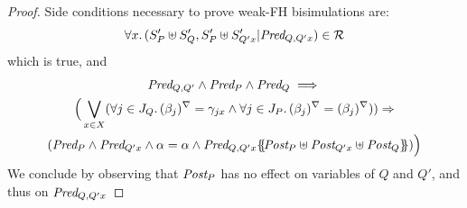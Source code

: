\documentclass{lmcs}
\begin{document}
\begin{proof}
Side conditions necessary to prove weak-FH bisimulations are:
\[\forall x.\, (S'_P\uplus S'_Q,S'_P\uplus S'_{Q' x}| \Pred_{Q,Q' x})\in\mathcal{R}\]
which is true, and
\begin{multline*}
\Pred_{Q,Q'}\land \Pred_P\land \Pred_Q \implies \\
\Big(\bigvee_{x\in X}
(\forall j\in J_Q.\, \vis{\beta_j}=\gamma_{j x}\land \forall j\in J_P.\, \vis{\beta_j}=\vis{\beta_j}))\Rightarrow \\(\Pred_P\land \Pred_{Q' x}\land \alpha=\alpha \land \Pred_{Q,Q' x}\subst{\Post_P\uplus\Post_{Q' x}\uplus \Post_{Q}}) \Big)
\end{multline*}
We conclude by observing that $\Post_P$ has no effect on variables of $Q$ and $Q'$, and thus on $\Pred_{Q,Q' x}$
%
%
%
%
%
%
%
%
 \end{proof}
\end{document}
